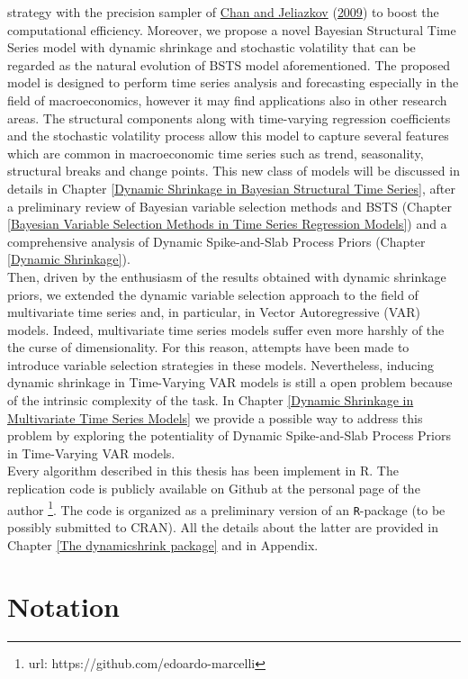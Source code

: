 \documentclass[
  12pt,
]{book}
\theoremstyle{break}
\theoremstyle{nonumberplain}
\begin{document}
strategy with the precision sampler of
\protect\hyperlink{ref-chan_jeliazkov_2009}{Chan and Jeliazkov}
(\protect\hyperlink{ref-chan_jeliazkov_2009}{2009}) to boost the
computational efficiency. Moreover, we propose a novel Bayesian
Structural Time Series model with dynamic shrinkage and stochastic
volatility that can be regarded as the natural evolution of BSTS model
aforementioned. The proposed model is designed to perform time series
analysis and forecasting especially in the field of macroeconomics,
however it may find applications also in other research areas. The
structural components along with time-varying regression coefficients
and the stochastic volatility process allow this model to capture
several features which are common in macroeconomic time series such as
trend, seasonality, structural breaks and change points. This new class
of models will be discussed in details in Chapter
\ref{Dynamic Shrinkage in Bayesian Structural Time Series}, after a
preliminary review of Bayesian variable selection methods and BSTS
(Chapter
\ref{Bayesian Variable Selection Methods in Time Series Regression Models})
and a comprehensive analysis of Dynamic Spike-and-Slab Process Priors
(Chapter \ref{Dynamic Shrinkage}).\\
Then, driven by the enthusiasm of the results obtained with dynamic
shrinkage priors, we extended the dynamic variable selection approach to
the field of multivariate time series and, in particular, in Vector
Autoregressive (VAR) models. Indeed, multivariate time series models
suffer even more harshly of the the curse of dimensionality. For this
reason, attempts have been made to introduce variable selection
strategies in these models. Nevertheless, inducing dynamic shrinkage in
Time-Varying VAR models is still a open problem because of the intrinsic
complexity of the task. In Chapter
\ref{Dynamic Shrinkage in Multivariate Time Series Models} we provide a
possible way to address this problem by exploring the potentiality of
Dynamic Spike-and-Slab Process Priors in Time-Varying VAR models.\\
Every algorithm described in this thesis has been implement in R. The
replication code is publicly available on Github at the personal page of
the author \footnote{url: https://github.com/edoardo-marcelli}. The code
is organized as a preliminary version of an \texttt{R}-package (to be
possibly submitted to CRAN). All the details about the latter are
provided in Chapter \ref{The dynamicshrink package} and in Appendix.

\section{Notation}
\end{document}
